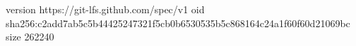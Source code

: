 version https://git-lfs.github.com/spec/v1
oid sha256:c2add7ab5c5b44425247321f5cb0b6530535b5c868164c24a1f60f60d21069bc
size 262240
